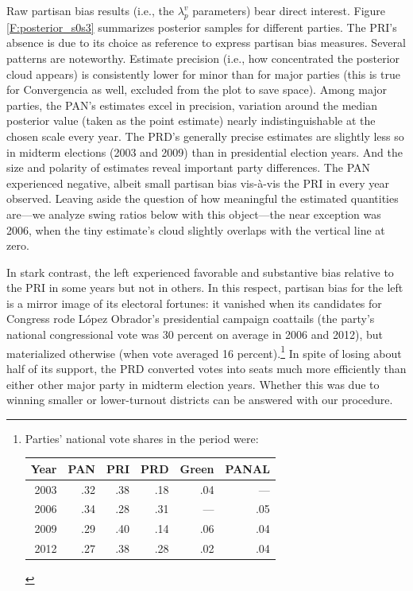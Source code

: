 \documentclass[letter,12pt]{article}
\begin{document}

Raw partisan bias results (i.e., the $\lambda_p^v$ parameters) bear direct interest. Figure \ref{F:posterior_s0s3} summarizes posterior samples for different parties. The PRI's absence is due to its choice as reference to express partisan bias measures. Several patterns are noteworthy. Estimate precision (i.e., how concentrated the posterior cloud appears) is consistently lower for minor than for major parties (this is true for Convergencia as well, excluded from the plot to save space). Among major parties, the PAN's estimates excel in precision, variation around the median posterior value (taken as the point estimate) nearly indistinguishable at the chosen scale every year. The PRD's generally precise estimates are slightly less so in midterm elections (2003 and 2009) than in presidential election years. And the size and polarity of estimates reveal important party differences. The PAN experienced negative, albeit small partisan bias vis-\`a-vis the PRI in every year observed. Leaving aside the question of how meaningful the estimated quantities are---we analyze swing ratios below with this object---the near exception was 2006, when the tiny estimate's cloud slightly overlaps with the vertical line at zero. 

In stark contrast, the left experienced favorable and substantive bias relative to the PRI in some years but not in others. In this respect, partisan bias for the left is a mirror image of its electoral fortunes: it vanished when its candidates for Congress rode L\'opez Obrador's presidential campaign coattails (the party's national congressional vote was 30 percent on average in 2006 and 2012), but materialized otherwise (when vote averaged 16 percent).\footnote{Parties' national vote shares in the period were: \begin{tabular}{rrrrrr} Year & PAN & PRI & PRD & Green & PANAL \\ \hline 2003 & .32 & .38 & .18 & .04 & --- \\ 2006 & .34 & .28 & .31 & --- & .05 \\ 2009 & .29 & .40 & .14 & .06 & .04 \\ 2012 & .27 & .38 & .28 & .02 & .04 \\ \end{tabular}} In spite of losing about half of its support, the PRD converted votes into seats much more efficiently than either other major party in midterm election years. Whether this was due to winning smaller or lower-turnout districts can be answered with our procedure.
\end{document}
